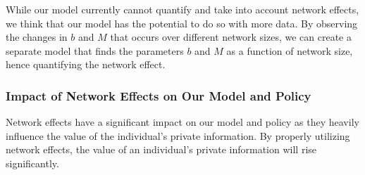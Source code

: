 \documentclass{icmmcm}
\begin{document}
While our model currently cannot quantify and take into account network effects, we think that our model has the potential to do so with more data. By observing the changes in $b$ and $M$ that occurs over different network sizes, we can create a separate model that finds the parameters $b$ and $M$ as a function of network size, hence quantifying the network effect.




\subsubsection{Impact of Network Effects on Our Model and Policy}
Network effects have a significant impact on our model and policy as they heavily influence the value of the individual’s private information. By properly utilizing network effects, the value of an individual’s private information will rise significantly. 

\end{document}
